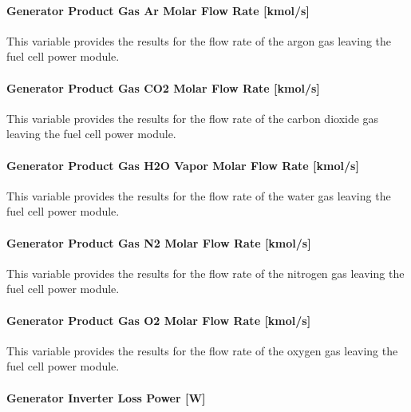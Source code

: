 \paragraph{Generator Product Gas Ar Molar Flow Rate {[}kmol/s{]}}\label{generator-product-gas-ar-molar-flow-rate-kmols}

This variable provides the results for the flow rate of the argon gas leaving the fuel cell power module.

\paragraph{Generator Product Gas CO2 Molar Flow Rate {[}kmol/s{]}}\label{generator-product-gas-co2-molar-flow-rate-kmols}

This variable provides the results for the flow rate of the carbon dioxide gas leaving the fuel cell power module.

\paragraph{Generator Product Gas H2O Vapor Molar Flow Rate {[}kmol/s{]}}\label{generator-product-gas-h2o-vapor-molar-flow-rate-kmols}

This variable provides the results for the flow rate of the water gas leaving the fuel cell power module.

\paragraph{Generator Product Gas N2 Molar Flow Rate {[}kmol/s{]}}\label{generator-product-gas-n2-molar-flow-rate-kmols}

This variable provides the results for the flow rate of the nitrogen gas leaving the fuel cell power module.

\paragraph{Generator Product Gas O2 Molar Flow Rate {[}kmol/s{]}}\label{generator-product-gas-o2-molar-flow-rate-kmols}

This variable provides the results for the flow rate of the oxygen gas leaving the fuel cell power module.

\paragraph{Generator Inverter Loss Power {[}W{]}}\label{generator-inverter-loss-power-w}

